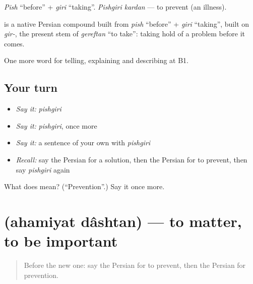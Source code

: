 \emph{Pish} \textquotedblleft{}before\textquotedblright{} + \emph{giri} \textquotedblleft{}taking\textquotedblright{}. \emph{Pishgiri kardan} — to prevent (an illness).

\begin{cousinweb}
\textbf{} is a native Persian compound built from \emph{pish} \textquotedblleft{}before\textquotedblright{} + \emph{giri} \textquotedblleft{}taking\textquotedblright{}, built on \emph{gir-}, the present stem of \emph{gereftan} \textquotedblleft{}to take\textquotedblright{}: taking hold of a problem before it comes.
\end{cousinweb}

\begin{grammarlens}[title={What you've built}]
One more word for telling, explaining and describing at B1.
\end{grammarlens}

\subsection*{Your turn}
\begin{itemize}
\raggedright
  \item \emph{Say it:} \emph{pishgiri}
  \item \emph{Say it:} \emph{pishgiri}, once more
  \item \emph{Say it:} a sentence of your own with \emph{pishgiri}
  \item \emph{Recall:} say the Persian for a solution, then the Persian for to prevent, then say \emph{pishgiri} again
\end{itemize}

\begin{tcolorbox}[breakable,colback=teal!4,colframe=teal!35!black,title={Before you move on}]
What does  mean? (\textquotedblleft{}Prevention\textquotedblright{}.) Say it once more.
\end{tcolorbox}
\section[\texorpdfstring{\fa{اهمیت} \fa{داشتن} (ahamiyat dâshtan)}{اهمیت داشتن (ahamiyat dâshtan)}]{  (ahamiyat dâshtan) — to matter, to be important}

\label{lesson:FA-C377-ahamiyyat-dashtan}



\begin{quote}
Before the new one: say the Persian for to prevent, then the Persian for prevention.
\end{quote}

